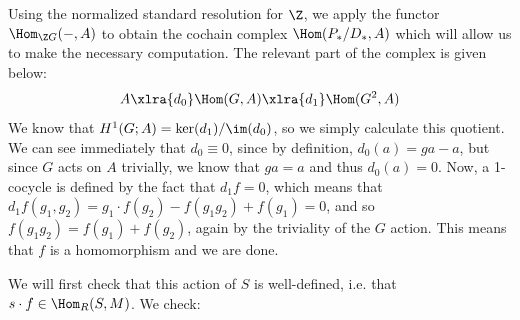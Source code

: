 Using the normalized standard resolution for $\Z$, we apply the functor $\Hom_{\Z G}(-,A)$ to obtain the cochain complex $\Hom(P_*/D_*, A)$ which will allow us to make the necessary computation. The relevant part of the complex is given below:
\[
A\xlra{d_0}\Hom(G,A)\xlra{d_1}\Hom(G^2,A)
\]
We know that $H^1(G;A)=\ker(d_1)/\im(d_0)$, so we simply calculate this quotient. We can see immediately that $d_0\equiv 0$, since by definition, $d_0(a)=ga-a$, but since $G$ acts on $A$ trivially, we know that $ga=a$ and thus $d_0(a)=0$. Now, a 1-cocycle is defined by the fact that $d_1f=0$, which means that $d_1f(g_1,g_2)= g_1 \cdot f(g_2) - f(g_1 g_2) + f(g_1)=0$, and so $f(g_1g_2)=f(g_1)+f(g_2)$, again by the triviality of the $G$ action. This means that $f$ is a homomorphism and we are done.

\begin{question}
    
\end{question}
We will first check that this action of $S$ is well-defined, i.e. that $s\cdot f\in\Hom_R(S,M)$. We check:
